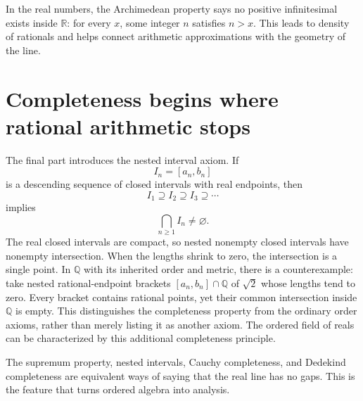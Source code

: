 In the real numbers, the Archimedean property says no positive infinitesimal exists inside \(\mathbb R\): for every \(x\), some integer \(n\) satisfies \(n>x\).  This leads to density of rationals and helps connect arithmetic approximations with the geometry of the line.

\section{Completeness begins where rational arithmetic stops}

The final part introduces the nested interval axiom.  If
\[
  I_n=[a_n,b_n]
\]
is a descending sequence of closed intervals with real endpoints, then
\[
  I_1\supseteq I_2\supseteq I_3\supseteq\cdots
\]
implies
\[
  \bigcap_{n\ge1}I_n\neq\varnothing.
\]
The real closed intervals are compact, so nested nonempty closed intervals have nonempty intersection. When the lengths shrink to zero, the intersection is a single point. In \(\mathbb Q\) with its inherited order and metric, there is a counterexample: take nested rational-endpoint brackets \([a_n,b_n]\cap\mathbb Q\) of \(\sqrt2\) whose lengths tend to zero. Every bracket contains rational points, yet their common intersection inside \(\mathbb Q\) is empty. This distinguishes the completeness property from the ordinary order axioms, rather than merely listing it as another axiom. The ordered field of reals can be characterized by this additional completeness principle.

The supremum property, nested intervals, Cauchy completeness, and Dedekind completeness are equivalent ways of saying that the real line has no gaps.  This is the feature that turns ordered algebra into analysis.
